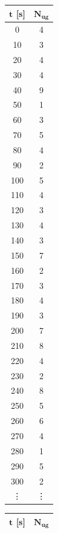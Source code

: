\documentclass{article}
\begin{document}
\begin{table}[!p]

\begin{minipage}{0.47\textwidth}
\raggedleft
\begin{tabular}{cc}
\hline
$\bm{t}$ [s] & $\bm{N_{ug}}$ \\
\hline

        0 &      4 \\
        10 &      3 \\
        20 &      4 \\
        30 &      4 \\
        40 &      9 \\
        50 &      1 \\
        60 &      3 \\
        70 &      5 \\
        80 &      4 \\
        90 &      2 \\
        100 &      5 \\
        110 &      4 \\
        120 &      3 \\
        130 &      4 \\
        140 &      3 \\
        150 &      7 \\
        160 &      2 \\
        170 &      3 \\
        180 &      4 \\
        190 &      3 \\
        200 &      7 \\
        210 &      8 \\
        220 &      4 \\
        230 &      2 \\
        240 &      8 \\
        250 &      5 \\
        260 &      6 \\
        270 &      4 \\
        280 &      1 \\
        290 &      5 \\
        300 &      2 \\
        \vdots & \vdots \\
\hline
\end{tabular}%

\end{minipage} \hfill
\begin{minipage}{0.47\textwidth}
\raggedright
\begin{tabular}{cc}
\hline
$\bm{t}$ [s] & $\bm{N_{ug}}$ \\
\hline
    

\end{tabular}
\end{minipage}
\end{table}
\end{document}

